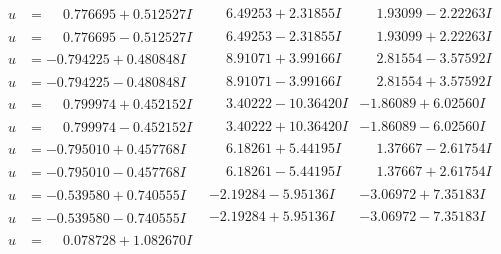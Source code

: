 \documentclass[1p]{elsarticle_modified}
\theoremstyle{definition}
\begin{document}
$$\begin{array}{c|c|c}
\begin{aligned}
u &= \phantom{-}0.776695 + 0.512527 I\end{aligned}
 & \phantom{-}6.49253 + 2.31855 I & \phantom{-}1.93099 - 2.22263 I \\ \hline\begin{aligned}
u &= \phantom{-}0.776695 - 0.512527 I\end{aligned}
 & \phantom{-}6.49253 - 2.31855 I & \phantom{-}1.93099 + 2.22263 I \\ \hline\begin{aligned}
u &= -0.794225 + 0.480848 I\end{aligned}
 & \phantom{-}8.91071 + 3.99166 I & \phantom{-}2.81554 - 3.57592 I \\ \hline\begin{aligned}
u &= -0.794225 - 0.480848 I\end{aligned}
 & \phantom{-}8.91071 - 3.99166 I & \phantom{-}2.81554 + 3.57592 I \\ \hline\begin{aligned}
u &= \phantom{-}0.799974 + 0.452152 I\end{aligned}
 & \phantom{-}3.40222 - 10.36420 I & -1.86089 + 6.02560 I \\ \hline\begin{aligned}
u &= \phantom{-}0.799974 - 0.452152 I\end{aligned}
 & \phantom{-}3.40222 + 10.36420 I & -1.86089 - 6.02560 I \\ \hline\begin{aligned}
u &= -0.795010 + 0.457768 I\end{aligned}
 & \phantom{-}6.18261 + 5.44195 I & \phantom{-}1.37667 - 2.61754 I \\ \hline\begin{aligned}
u &= -0.795010 - 0.457768 I\end{aligned}
 & \phantom{-}6.18261 - 5.44195 I & \phantom{-}1.37667 + 2.61754 I \\ \hline\begin{aligned}
u &= -0.539580 + 0.740555 I\end{aligned}
 & -2.19284 - 5.95136 I & -3.06972 + 7.35183 I \\ \hline\begin{aligned}
u &= -0.539580 - 0.740555 I\end{aligned}
 & -2.19284 + 5.95136 I & -3.06972 - 7.35183 I \\ \hline\begin{aligned}
u &= \phantom{-}0.078728 + 1.082670 I\end{aligned}

\end{array}$$
\end{document}
